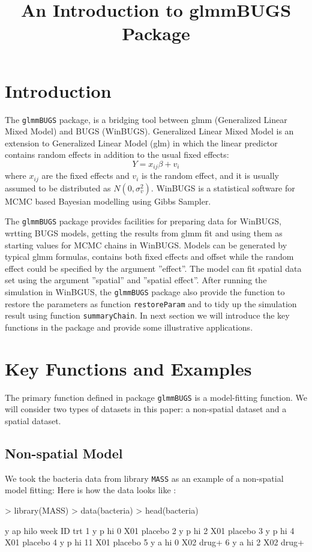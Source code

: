 \documentclass{article}
\title{An Introduction to glmmBUGS Package}
\begin{document}
\maketitle

\large
\section{Introduction}
The \verb!glmmBUGS! package, is a bridging tool between glmm (Generalized Linear Mixed Model) and BUGS (WinBUGS).
Generalized Linear Mixed Model is an extension to Generalized Linear Model (glm) in which the linear predictor contains random effects
in addition to the usual fixed effects:
\[Y = x_{ij}\beta + v_i\]
where $x_{ij}$ are the fixed effects and $v_i$ is the random effect, and it is usually assumed to be distributed as $N(0, \sigma_v^2)$.
WinBUGS is a statistical software for MCMC based Bayesian modelling using Gibbs Sampler.


The \verb!glmmBUGS! package provides facilities for preparing data for WinBUGS, wrtting BUGS models, getting the results from glmm fit and using them as starting values for MCMC chains in WinBUGS.
Models can be generated by typical glmm formulas, contains both fixed effects and offset while the random effect could be specified by the argument ''effect''.
The model can fit spatial data set using the argument ''spatial'' and ''spatial effect''.
After running the simulation in WinBGUS, the \verb!glmmBUGS! package also provide the function to restore the
parameters as function \verb!restoreParam! and to tidy up the simulation result using function \verb!summaryChain!.
In next section we will introduce the key functions in the package and provide some illustrative applications.

\section{Key Functions and Examples}
The primary function defined in package \verb!glmmBUGS! is a model-fitting function.
We will consider two types of datasets in this paper: a non-spatial dataset and a spatial dataset.

\subsection{Non-spatial Model} 
We took the bacteria data from library \verb!MASS! as an example of a non-spatial model fitting:
Here is how the data looks like : 
\begin{Schunk}
\begin{Sinput}
> library(MASS)
> data(bacteria)
> head(bacteria)
\end{Sinput}
\begin{Soutput}
  y ap hilo week  ID     trt
1 y  p   hi    0 X01 placebo
2 y  p   hi    2 X01 placebo
3 y  p   hi    4 X01 placebo
4 y  p   hi   11 X01 placebo
5 y  a   hi    0 X02   drug+
6 y  a   hi    2 X02   drug+
\end{Soutput}
\end{Schunk}
\end{document}
